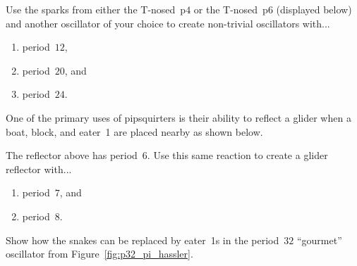 \begin{multicols}{2}
\begin{problem}
		\begin{center}
		\end{center}
	\end{problem}
	
	
	\mfilbreak
	
	
	\begin{problemstar}\label{exer:t_sparkers} 
		Use the sparks from either the T-nosed~p$4$ or the T-nosed~p$6$ (displayed below) and another oscillator of your choice to create non-trivial oscillators with...
		
		\begin{center}
		\end{center}
		
		\begin{enumerate}[label=\bf\color{ocre}(\alph*)]
			\item period~$12$,
			
			\item period~$20$, and
			
			\item period~$24$.
		\end{enumerate}
	\end{problemstar}
	
	
	\mfilbreak
	
	
	\begin{problem}\label{exer:pipsquirter_reflectors}
		One of the primary uses of pipsquirters is their ability to reflect a glider when a boat, block, and eater~1 are placed nearby as shown below.
		
		\begin{center}
		\end{center}
		
		\noindent The reflector above has period~$6$. Use this same reaction to create a glider reflector with...\smallskip
		
		\begin{enumerate}[label=\bf\color{ocre}(\alph*)]
			\item {} period~$7$, and
			
			\item {} period~$8$.
		\end{enumerate}
	\end{problem}


	\mfilbreak
	
	
	\begin{problemstar}\label{exer:p32_pi_hassler_eaters} 
		Show how the snakes can be replaced by eater~1s in the period~$32$ ``gourmet'' oscillator from Figure~\ref{fig:p32_pi_hassler}.
	\end{problemstar}
	

\end{multicols}
